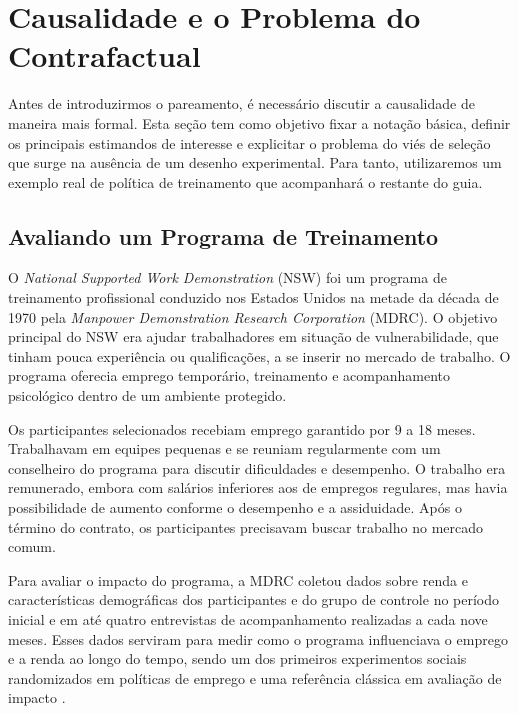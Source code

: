 \documentclass[12pt,a4paper]{article}
\begin{document}
\newpage
\section{Causalidade e o Problema do Contrafactual}\label{sec:causalidade}

Antes de introduzirmos o pareamento, é necessário discutir a causalidade de maneira mais formal. Esta seção tem como objetivo fixar a notação básica, definir os principais estimandos de interesse e explicitar o problema do viés de seleção que surge na ausência de um desenho experimental. Para tanto, utilizaremos um exemplo real de política de treinamento que acompanhará o restante do guia.

\subsection{Avaliando um Programa de Treinamento}

O \textit{National Supported Work Demonstration} (NSW) foi um programa de treinamento profissional conduzido nos Estados Unidos na metade da década de 1970 pela \textit{Manpower Demonstration Research Corporation} (MDRC). O objetivo principal do NSW era ajudar trabalhadores em situação de vulnerabilidade, que tinham pouca experiência ou qualificações, a se inserir no mercado de trabalho. O programa oferecia emprego temporário, treinamento e acompanhamento psicológico dentro de um ambiente protegido.

Os participantes selecionados recebiam emprego garantido por 9 a 18 meses. Trabalhavam em equipes pequenas e se reuniam regularmente com um conselheiro do programa para discutir dificuldades e desempenho. O trabalho era remunerado, embora com salários inferiores aos de empregos regulares, mas havia possibilidade de aumento conforme o desempenho e a assiduidade. Após o término do contrato, os participantes precisavam buscar trabalho no mercado comum.

Para avaliar o impacto do programa, a MDRC coletou dados sobre renda e características demográficas dos participantes e do grupo de controle no período inicial e em até quatro entrevistas de acompanhamento realizadas a cada nove meses. Esses dados serviram para medir como o programa influenciava o emprego e a renda ao longo do tempo, sendo um dos primeiros experimentos sociais randomizados em políticas de emprego e uma referência clássica em avaliação de impacto \citep{LalondeNSW1986}.
\end{document}
